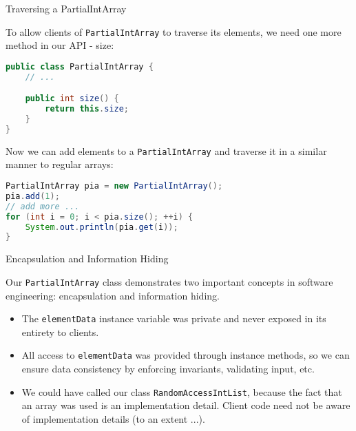 \documentclass{beamer}
\begin{document}
\begin{frame}[fragile]{Traversing a PartialIntArray}


To allow clients of {\tt PartialIntArray} to traverse its elements, we need one more method in our API - size:
\begin{lstlisting}[language=Java]
public class PartialIntArray {
    // ...

    public int size() {
        return this.size;
    }
}
\end{lstlisting}
Now we can add elements to a {\tt PartialIntArray} and traverse it in a similar manner to regular arrays:

\begin{lstlisting}[language=Java]
PartialIntArray pia = new PartialIntArray();
pia.add(1);
// add more ...
for (int i = 0; i < pia.size(); ++i) {
    System.out.println(pia.get(i));
}
\end{lstlisting}

\end{frame}

\begin{frame}[fragile]{Encapsulation and Information Hiding}


Our {\tt PartialIntArray} class demonstrates two important concepts in software engineering: encapsulation and information hiding.

\begin{itemize}
\item The {\tt elementData} instance variable was private and never exposed in its entirety to clients.
\item All access to {\tt elementData} was provided through instance methods, so we can ensure data consistency by enforcing invariants, validating input, etc.
\item We could have called our class {\tt RandomAccessIntList}, because the fact that an array was used is an implementation detail.  Client code need not be aware of implementation details (to an extent ...).
\end{itemize}


\end{frame}
\end{document}
